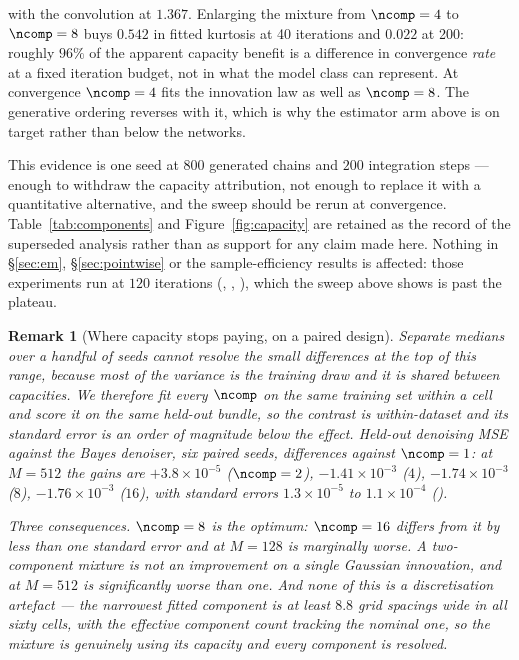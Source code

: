 \documentclass{article}
\newtheorem{remark}{Remark}
\begin{document}
\noindent
with the convolution at $1.367$. Enlarging the mixture from $\ncomp=4$ to $\ncomp=8$ buys $0.542$
in fitted kurtosis at 40 iterations and $0.022$ at 200: roughly $96\%$ of the apparent capacity
benefit is a difference in convergence \emph{rate} at a fixed iteration budget, not in what the
model class can represent. At convergence $\ncomp=4$ fits the innovation law as well as
$\ncomp=8$. The generative ordering reverses with it, which is why the estimator arm above is on
target rather than below the networks.

This evidence is one seed at $800$ generated chains and $200$ integration steps --- enough to
withdraw the capacity attribution, not enough to replace it with a quantitative alternative, and
the sweep should be rerun at convergence. Table~\ref{tab:components} and
Figure~\ref{fig:capacity} are retained as the record of the superseded analysis rather than as
support for any claim made here. Nothing in \S\ref{sec:em}, \S\ref{sec:pointwise} or the
sample-efficiency results is affected: those experiments run at $120$ iterations
(, , ), which the sweep above shows is past
the plateau.

\begin{remark}[Where capacity stops paying, on a paired design]
\label{rem:paired}
Separate medians over a handful of seeds cannot resolve the small differences at the top of this
range, because most of the variance is the training draw and it is shared between capacities. We
therefore fit every $\ncomp$ on the \emph{same} training set within a cell and score it on the
\emph{same} held-out bundle, so the contrast is within-dataset and its standard error is an order
of magnitude below the effect. Held-out denoising MSE against the Bayes denoiser, six paired
seeds, differences against $\ncomp=1$: at $M=512$ the gains are $+3.8\times10^{-5}$
($\ncomp=2$), $-1.41\times10^{-3}$ ($4$), $-1.74\times10^{-3}$ ($8$), $-1.76\times10^{-3}$
($16$), with standard errors $1.3\times10^{-5}$ to $1.1\times10^{-4}$
().

Three consequences. $\ncomp=8$ is the optimum: $\ncomp=16$ differs from it by less than one
standard error and at $M=128$ is marginally worse. A two-component mixture is \emph{not} an
improvement on a single Gaussian innovation, and at $M=512$ is significantly worse than one. And
none of this is a discretisation artefact --- the narrowest fitted component is at least $8.8$
grid spacings wide in all sixty cells, with the effective component count tracking the nominal
one, so the mixture is genuinely using its capacity and every component is resolved.
\end{remark}
\end{document}
